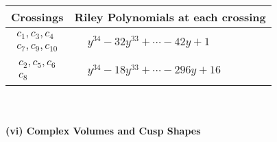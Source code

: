 \documentclass[1p]{elsarticle_modified}
\theoremstyle{definition}
\begin{document}
\begin{tabular}{m{50pt}|m{274pt}}
Crossings & \hspace{64pt}Riley Polynomials at each crossing \\
\hline $$\begin{aligned}c_{1},c_{3},c_{4}\\c_{7},c_{9},c_{10}\end{aligned}$$&$\begin{aligned}
&y^{34}-32 y^{33}+\cdots-42 y+1
\end{aligned}$\\
\hline $$\begin{aligned}c_{2},c_{5},c_{6}\\c_{8}\end{aligned}$$&$\begin{aligned}
&y^{34}-18 y^{33}+\cdots-296 y+16
\end{aligned}$\\
\hline
\end{tabular}\\~\\
\newpage\flushleft \textbf{(vi) Complex Volumes and Cusp Shapes}
\end{document}
